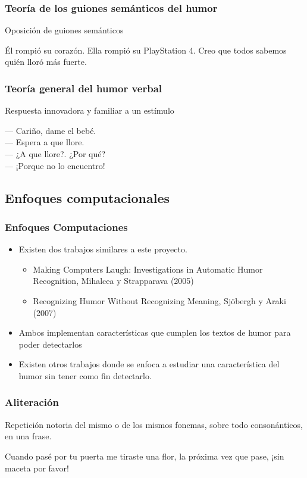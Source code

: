\begin{frame}
\frametitle{Teoría de los guiones semánticos del humor}
    Oposición de guiones semánticos
    \begin{example}
        Él rompió su corazón. Ella rompió su PlayStation 4. Creo que todos sabemos quién lloró más fuerte.
    \end{example}
\end{frame}

\begin{frame}
\frametitle{Teoría general del humor verbal}
    Respuesta innovadora y familiar a un estímulo
    \begin{example}
        — Cariño, dame el bebé.\\
        — Espera a que llore.\\
        — ¿A que llore?. ¿Por qué?\\
        — ¡Porque no lo encuentro!\\
    \end{example}
\end{frame}

\subsection{Enfoques computacionales}
\begin{frame}
\frametitle{Enfoques Computaciones}
    \begin{itemize}
        \item Existen dos trabajos similares a este proyecto.
        \begin{itemize}
            \item Making Computers Laugh: Investigations in Automatic Humor Recognition, Mihalcea y Strapparava (2005)
            \item Recognizing Humor Without Recognizing Meaning, Sjöbergh y Araki (2007)
        \end{itemize}
        \item Ambos implementan características que cumplen los textos de humor para poder detectarlos
        \item Existen otros trabajos donde se enfoca a estudiar una característica del humor sin tener como fin detectarlo.
    \end{itemize}
\end{frame}

\begin{frame}
\frametitle{Aliteración}
    Repetición notoria del mismo o de los mismos fonemas, sobre todo consonánticos, en una frase.
    \begin{example}
        Cuando pasé por tu puerta me tiraste una flor, la próxima vez que pase, ¡sin maceta por favor!
    \end{example}
\end{frame}

